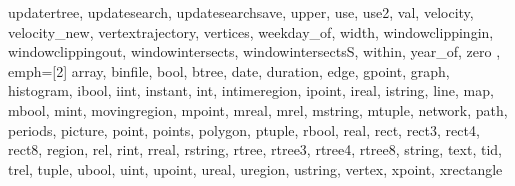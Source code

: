 {{        updatertree, updatesearch, updatesearchsave, upper, use, use2, val, velocity, velocity\_new, 
        vertextrajectory, vertices, weekday\_of, width, windowclippingin, windowclippingout, 
        windowintersects, windowintersectsS, within, year\_of, zero },
                                  emph=[2]{ array, binfile, bool, btree, date, duration, 
                                            edge, gpoint, graph, histogram, 
        ibool, iint, instant, int, intimeregion, ipoint, ireal, istring, line, map, 
        mbool, mint, movingregion, mpoint, mreal, mrel, mstring, mtuple, network, 
        path, periods, picture, point, points, polygon, ptuple, rbool, real, rect, 
        rect3, rect4, rect8, region, rel, rint, rreal, rstring, rtree, rtree3, rtree4, 
        rtree8, string, text, tid, trel, tuple, ubool, uint, upoint, ureal, uregion, 
        ustring, vertex, xpoint, xrectangle}
                                  }

